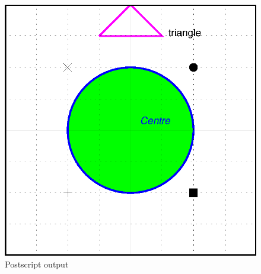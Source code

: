 \begin{figure}[h]
\begin{center}
\includegraphics{exemple.ps}
\end{center}
\caption{Postscript output}
\end{figure}


